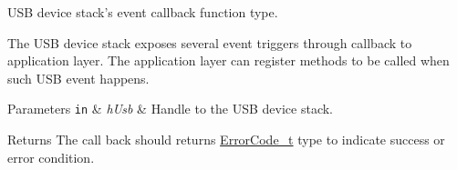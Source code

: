 U\-S\-B device stack's event callback function type. 

The U\-S\-B device stack exposes several event triggers through callback to application layer. The application layer can register methods to be called when such U\-S\-B event happens.


\begin{DoxyParams}[1]{Parameters}
\mbox{\tt in}  & {\em h\-Usb} & Handle to the U\-S\-B device stack. \\
\hline
\end{DoxyParams}
\begin{DoxyReturn}{Returns}
The call back should returns \hyperlink{error_8h_a905255056c349318139d94aa4523d516}{Error\-Code\-\_\-t} type to indicate success or error condition. 
\end{DoxyReturn}


